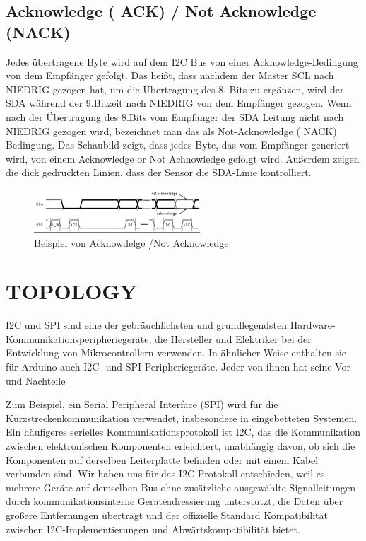 \documentclass[conference]{IEEEtran}
\begin{document}
\subsection{Acknowledge ( ACK) / Not Acknowledge  (NACK)}
Jedes übertragene Byte wird auf dem I2C Bus von einer Acknowledge-Bedingung  von dem Empfänger gefolgt. Das heißt, dass nachdem der Master SCL nach NIEDRIG gezogen hat, um die Übertragung des 8. Bits zu ergänzen, wird der SDA während der 9.Bitzeit nach NIEDRIG von dem Empfänger gezogen. Wenn nach der Übertragung des 8.Bits vom Empfänger der SDA Leitung nicht nach NIEDRIG  gezogen wird, bezeichnet man das als Not-Acknowledge ( NACK) Bedingung.
Das Schaubild zeigt, dass jedes Byte, das vom Empfänger generiert wird, von einem Acknowledge or Not Achnowledge gefolgt wird. Außerdem zeigen die dick gedruckten Linien, dass der Sensor die SDA-Linie kontrolliert.   
\begin{figure}
	\centering
	\includegraphics[width=0.7\linewidth]{fig8}
	\caption{Beispiel von  Acknowdelge /Not Acknowledge}
	\label{fig:fig8}
\end{figure}

\section{TOPOLOGY }
I2C und SPI sind eine der gebräuchlichsten und grundlegendsten Hardware-Kommunikationsperipheriegeräte, die Hersteller und Elektriker bei der Entwicklung von Mikrocontrollern verwenden. In ähnlicher Weise enthalten sie für Arduino auch I2C- und SPI-Peripheriegeräte. Jeder von ihnen hat seine Vor- und Nachteile

Zum Beispiel, ein Serial Peripheral Interface (SPI) wird für die Kurzstreckenkommunikation verwendet, insbesondere in eingebetteten Systemen. Ein häufigeres serielles Kommunikationsprotokoll ist I2C, das die Kommunikation zwischen elektronischen Komponenten erleichtert, unabhängig davon, ob sich die Komponenten auf derselben Leiterplatte befinden oder mit einem Kabel verbunden sind.
Wir haben uns für das I2C-Protokoll entschieden, weil es mehrere Geräte auf demselben Bus ohne zusätzliche ausgewählte Signalleitungen durch kommunikationsinterne Geräteadressierung unterstützt, die Daten über größere Entfernungen überträgt und der offizielle Standard Kompatibilität zwischen I2C-Implementierungen und Abwärtskompatibilität bietet.
\end{document}
